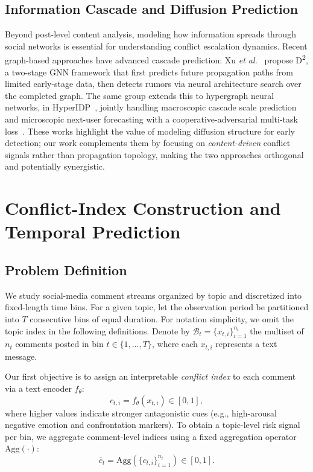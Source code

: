 \documentclass[journal]{IEEEtran}
\begin{document}
\subsection{Information Cascade and Diffusion Prediction}

Beyond post-level content analysis, modeling how information spreads through social networks is essential for understanding conflict escalation dynamics. Recent graph-based approaches have advanced cascade prediction: Xu \emph{et al.}~\cite{xu2025d2} propose D\textsuperscript{2}, a two-stage GNN framework that first predicts future propagation paths from limited early-stage data, then detects rumors via neural architecture search over the completed graph. The same group extends this to hypergraph neural networks, in HyperIDP~\cite{xu2025hyperidp}, jointly handling macroscopic cascade scale prediction and microscopic next-user forecasting with a cooperative-adversarial multi-task loss~\cite{xu2025hyperidpB}. These works highlight the value of modeling diffusion structure for early detection; our work complements them by focusing on \emph{content-driven} conflict signals rather than propagation topology, making the two approaches orthogonal and potentially synergistic.

\section{Conflict-Index Construction and Temporal Prediction}

\subsection{Problem Definition}

We study social-media comment streams organized by topic and discretized into fixed-length time bins. For a given topic, let the observation period be partitioned into $T$ consecutive bins of equal duration. For notation simplicity, we omit the topic index in the following definitions. Denote by $\mathcal{B}_t = \{x_{t,i}\}_{i=1}^{n_t}$ the multiset of $n_t$ comments posted in bin $t \in \{1, \dots, T\}$, where each $x_{t,i}$ represents a text message.

Our first objective is to assign an interpretable \emph{conflict index} to each comment via a text encoder $f_\theta$:
\begin{equation}
c_{t,i} = f_\theta(x_{t,i}) \in [0, 1],
\end{equation}
where higher values indicate stronger antagonistic cues (e.g., high-arousal negative emotion and confrontation markers). To obtain a topic-level risk signal per bin, we aggregate comment-level indices using a fixed aggregation operator $\mathrm{Agg}(\cdot)$:
\begin{equation}
\bar{c}_t = \mathrm{Agg}\left(\{c_{t,i}\}_{i=1}^{n_t}\right) \in [0, 1].
\end{equation}
\end{document}
